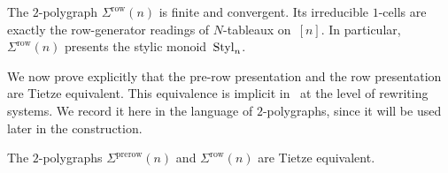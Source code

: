 \documentclass[a4paper, twoside, 11pt, english]{article}
\begin{document}
\begin{proposition}
\label{P:RowPresentationConvergent}
The $2$-polygraph $\Sigma^{\mathrm{row}}(n)$ is finite and convergent. Its
irreducible $1$-cells are exactly the row-generator readings of $N$-tableaux
on~$[n]$. In particular, $\Sigma^{\mathrm{row}}(n)$ presents the stylic
monoid~$\mathrm{Styl}_n$.
\end{proposition}

We now prove explicitly that the pre-row presentation and the row presentation
are Tietze equivalent. This equivalence is implicit in~\cite{LuoJinZhangStylic}
at the level of rewriting systems. We record it here in the language of
$2$-polygraphs, since it will be used later in the construction.



\begin{proposition}
\label{P:PrerowRowTietze}
The $2$-polygraphs $\Sigma^{\mathrm{prerow}}(n)$ and
$\Sigma^{\mathrm{row}}(n)$ are Tietze equivalent.
\end{proposition}
\end{document}
